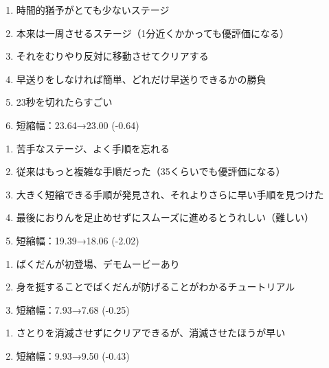 \begin{enumerate}[label={\sarrow}]
\item 時間的猶予がとても少ないステージ
\item 本来は一周させるステージ（1分近くかかっても優評価になる）
\item それをむりやり反対に移動させてクリアする
\item 早送りをしなければ簡単、どれだけ早送りできるかの勝負
\item 23秒を切れたらすごい
\item 短縮幅：23.64→23.00 (-0.64)
\end{enumerate}



\begin{enumerate}[label={\sarrow}]
\item 苦手なステージ、よく手順を忘れる
\item 従来はもっと複雑な手順だった（35くらいでも優評価になる）
\item 大きく短縮できる手順が発見され、それよりさらに早い手順を見つけた
\item 最後におりんを足止めせずにスムーズに進めるとうれしい（難しい）
\item 短縮幅：19.39→18.06 (-2.02)
\end{enumerate}



\begin{enumerate}[label={\sarrow}]
\item ばくだんが初登場、デモムービーあり
\item 身を挺することでばくだんが防げることがわかるチュートリアル
\item 短縮幅：7.93→7.68 (-0.25)
\end{enumerate}



\begin{enumerate}[label={\sarrow}]
\item さとりを消滅させずにクリアできるが、消滅させたほうが早い
\item 短縮幅：9.93→9.50 (-0.43)
\end{enumerate}



